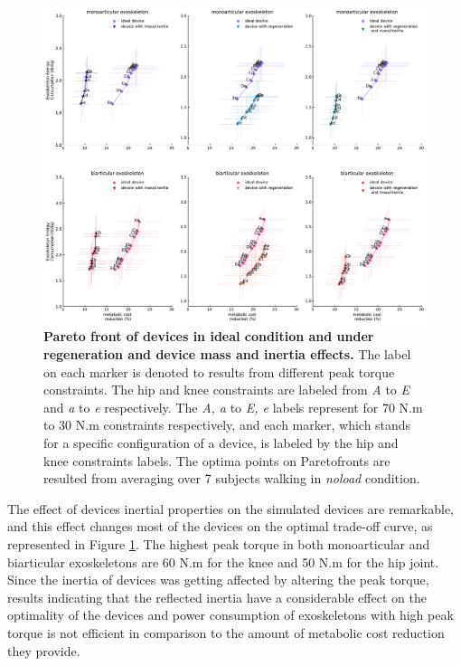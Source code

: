 \documentclass[10pt,letterpaper]{article}
\begin{document}
\begin{figure}[ht]   
	\centering
	\includegraphics[width=\linewidth]{Pareto_Mass_Regenration_Figures/PaperFigure_Pareto_Comparison.pdf}
	\vspace{1mm}
	\caption{{\small\textbf{Pareto front of devices in ideal condition and under regeneration and device mass and inertia effects.} The label on each marker is denoted to results from different peak torque constraints. The hip and knee constraints are labeled from {\it A} to {\it E} and {\it a} to {\it e} respectively. The {\it A, a} to {\it E, e} labels represent for 70 N.m to 30 N.m constraints respectively, and each marker, which stands for a specific configuration of a device, is labeled by the hip and knee constraints labels. The optima points on Paretofronts are resulted from averaging over 7 subjects walking in {\it noload} condition.}}
	\label{Fig_Paretofronts_Mass_Regeneration_Effect_Comparison}
\end{figure}
\vspace{2mm}
The effect of devices inertial properties on the simulated devices are remarkable, and this effect changes most of the devices on the optimal trade-off curve, as represented in Figure \ref{Fig_Paretofronts_Mass_Regeneration_Effect_Comparison}.  The highest peak torque in both monoarticular and biarticular exoskeletons are 60 N.m for the knee and 50 N.m for the hip joint. Since the inertia of devices was getting affected by altering the peak torque, results indicating that the reflected inertia have a considerable effect on the optimality of the devices and power consumption of exoskeletons with high peak torque is not efficient in comparison to the amount of metabolic cost reduction they provide.\\ 
\end{document}
